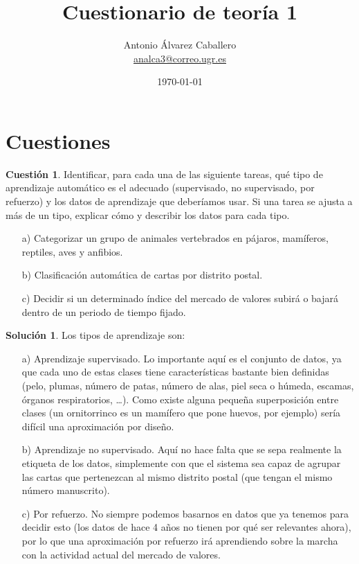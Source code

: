 \documentclass[a4paper, 11pt]{article}
\title{Cuestionario de teoría 1}
\author{Antonio Álvarez Caballero\\
    \href{mailto:analca3@correo.ugr.es}{analca3@correo.ugr.es}}
\date{\today}
\theoremstyle{definition}
\newtheorem{cuestion}{Cuestión}
\newtheorem*{solucion}{Solución}
\begin{document}
  \maketitle

  \section{Cuestiones}

  \begin{cuestion}
    Identificar, para cada una de las siguiente tareas, qué tipo de aprendizaje automático es el adecuado (supervisado, no supervisado, por refuerzo) y los datos de aprendizaje que deberíamos usar. Si una tarea se ajusta a más de un tipo, explicar cómo y describir los datos para cada tipo.
    \begin{enumerate}
      \item[a)] Categorizar un grupo de animales vertebrados en pájaros, mamíferos, reptiles, aves y anfibios.
      \item[b)] Clasificación automática de cartas por distrito postal.
      \item[c)] Decidir si un determinado índice del mercado de valores subirá o bajará dentro de un periodo de tiempo fijado.
    \end{enumerate}

  \end{cuestion}

  \begin{solucion}
    Los tipos de aprendizaje son:
    \begin{enumerate}
      \item[a)] Aprendizaje supervisado. Lo importante aquí es el conjunto de datos, ya que cada uno de estas clases tiene características bastante bien definidas (pelo, plumas, número de patas, número de alas, piel seca o húmeda, escamas, órganos respiratorios, \ldots). Como existe alguna pequeña superposición entre clases (un ornitorrinco es un mamífero que pone huevos, por ejemplo) sería difícil una aproximación por diseño.
      \item[b)] Aprendizaje no supervisado. Aquí no hace falta que se sepa realmente la etiqueta de los datos, simplemente con que el sistema sea capaz de agrupar las cartas que pertenezcan al mismo distrito postal (que tengan el mismo número manuscrito).
      \item[c)] Por refuerzo. No siempre podemos basarnos en datos que ya tenemos para decidir esto (los datos de hace 4 años no tienen por qué ser relevantes ahora), por lo que una aproximación por refuerzo irá aprendiendo sobre la marcha con la actividad actual del mercado de valores.
    \end{enumerate}
  \end{solucion}
\end{document}
